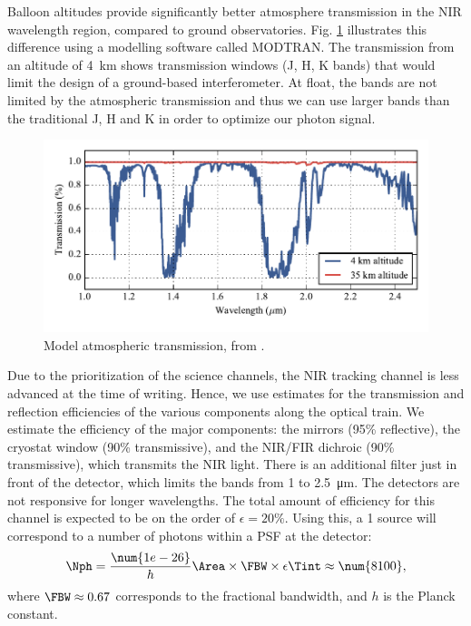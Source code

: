 Balloon altitudes provide significantly better atmosphere transmission in the NIR wavelength region, compared to ground observatories. Fig. \ref{fig:trans} illustrates this difference using a modelling software called MODTRAN. The transmission from an altitude of 4~km shows transmission windows (J, H, K bands) that would limit the design of a ground-based interferometer. At float, the bands are not limited by the atmospheric transmission and thus we can use larger bands than the traditional J, H and K in order to optimize our photon signal.

\begin{figure}[ht!]
\begin{center}
\includegraphics[width=\textwidth]{Figures/BETTII_atmo_transmission.pdf}
\vspace{-0.5cm}
\caption{Model atmospheric transmission, from \cite{Rizzo:2012jp}.}
\label{fig:trans}
\end{center}
\end{figure}

Due to the prioritization of the science channels, the NIR tracking channel is less advanced at the time of writing. Hence, we use estimates for the transmission and reflection efficiencies of the various components along the optical train. We estimate the efficiency of the major components: the mirrors (95\% reflective), the cryostat window (90\% transmissive), and the NIR/FIR dichroic (90\% transmissive), which transmits the NIR light. There is an additional filter just in front of the detector, which limits the bands from 1 to \SI{2.5}{\micro\meter}. The detectors are not responsive for longer wavelengths. The total amount of efficiency for this channel is expected to be on the order of $\epsilon = 20\%$. Using this, a \SI{1}{\jansky} source will correspond to a number of photons \Nph within a PSF at the detector:
\begin{align}
\Nph = \frac{\num{1e-26}}{h}\Area\times\FBW\times\epsilon\Tint \approx \num{8100},
\end{align}
where $\FBW \approx 0.67$ corresponds to the fractional bandwidth, and $h$ is the Planck constant. 

